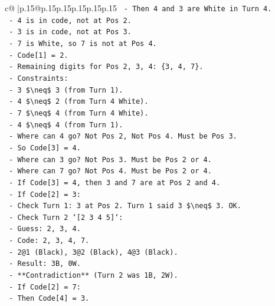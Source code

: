 \documentclass{article}
\begin{document}
{\begin{supertabular}{c@{$\;$}|p{.15\linewidth}@{}p{.15\linewidth}p{.15\linewidth}p{.15\linewidth}p{.15\linewidth}p{.15\linewidth}}
{{{\texttt{        {-} Then 4 and 3 are White in Turn 4.} \\
\texttt{          {-} 4 is in code, not at Pos 2.} \\
\texttt{          {-} 3 is in code, not at Pos 3.} \\
\texttt{        {-} 7 is White, so 7 is not at Pos 4.} \\
\texttt{        {-} Code{[}1{]} = 2.} \\
\texttt{        {-} Remaining digits for Pos 2, 3, 4: \{3, 4, 7\}.} \\
\texttt{        {-} Constraints:} \\
\texttt{          {-} 3 \$\textbackslash{}neq\$ 3 (from Turn 1).} \\
\texttt{          {-} 4 \$\textbackslash{}neq\$ 2 (from Turn 4 White).} \\
\texttt{          {-} 7 \$\textbackslash{}neq\$ 4 (from Turn 4 White).} \\
\texttt{          {-} 4 \$\textbackslash{}neq\$ 4 (from Turn 1).} \\
\texttt{        {-} Where can 4 go? Not Pos 2, Not Pos 4. Must be Pos 3.} \\
\texttt{          {-} So Code{[}3{]} = 4.} \\
\texttt{        {-} Where can 3 go? Not Pos 3. Must be Pos 2 or 4.} \\
\texttt{        {-} Where can 7 go? Not Pos 4. Must be Pos 2 or 4.} \\
\texttt{        {-} If Code{[}3{]} = 4, then 3 and 7 are at Pos 2 and 4.} \\
\texttt{        {-} If Code{[}2{]} = 3:} \\
\texttt{          {-} Check Turn 1: 3 at Pos 2. Turn 1 said 3 \$\textbackslash{}neq\$ 3. OK.} \\
\texttt{          {-} Check Turn 2 `{[}2 3 4 5{]}`:} \\
\texttt{            {-} Guess: 2, 3, 4.} \\
\texttt{            {-} Code: 2, 3, 4, 7.} \\
\texttt{            {-} 2@1 (Black), 3@2 (Black), 4@3 (Black).} \\
\texttt{            {-} Result: 3B, 0W.} \\
\texttt{            {-} **Contradiction** (Turn 2 was 1B, 2W).} \\
\texttt{        {-} If Code{[}2{]} = 7:} \\
\texttt{          {-} Then Code{[}4{]} = 3.} \\
}}}
\end{supertabular}}
\end{document}

